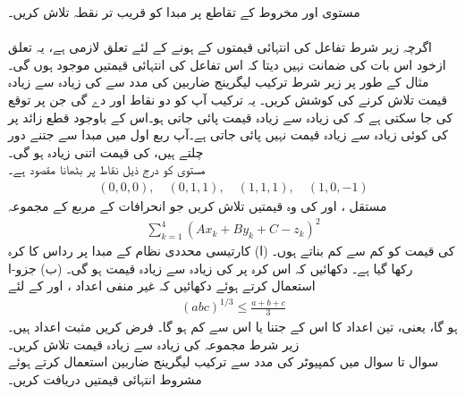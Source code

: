 مستوی   اور  مخروط  کے تقاطع پر مبدا کو قریب تر نقطہ تلاش کریں۔
\\
\\
اگرچہ زیر  شرط  تفاعل   کی انتہائی قیمتوں کے ہونے کے  لئے  تعلق  لازمی ہے،  یہ تعلق  ازخود  اس بات کی ضمانت نہیں دیتا کہ  اس تفاعل کی انتہائی قیمتیں موجود ہوں گی۔ مثال کے طور پر زیر شرط  ترکیب لیگرینج  ضاربین کی مدد سے  کی زیادہ سے زیادہ قیمت تلاش کرنے کی کوشش کریں۔ یہ ترکیب آپ کو دو نقاط  اور  دے  گی جن پر توقع کی جا سکتی ہے کہ  کی زیادہ سے زیادہ قیمت پائی جاتی ہو۔اس کے باوجود قطع زائد   پر  کی کوئی  زیادہ سے زیادہ قیمت نہیں پائی جاتی ہے۔آپ ربع اول میں مبدا سے جتنے دور چلتے ہیں،  کی قیمت اتنی زیادہ ہو گی۔
\\
مستوی  کو درج ذیل نقاط  پر بٹھانا مقصود ہے۔ 
\begin{align*}
(0,0,0),\quad (0,1,1),\quad (1,1,1),\quad (1,0,-1)
\end{align*}
مستقل ،  اور  کی وہ قیمتیں تلاش کریں جو  انحرافات  کے  مربع کے مجموعہ
\begin{align*}
\sum_{k=1}^4 (Ax_k+By_k+C-z_k)^2
\end{align*}
کی قیمت کو کم سے کم بناتے ہوں۔
(ا) کارتیسی محددی  نظام کے مبدا پر  رداس  کا کرہ رکھا گیا ہے۔ دکھائیں کہ اس کرہ پر  کی زیادہ سے زیادہ قیمت  ہو گی۔  (ب) جزو-ا استعمال کرتے ہوئے دکھائیں کہ غیر منفی اعداد ،  اور  کے لئے
\begin{align*}
(abc)^{1/3}\le \frac{a+b+c}{3}
\end{align*}
ہو گا، یعنی،  تین اعداد کا  اس کے    جتنا یا اس سے کم ہو گا۔
فرض کریں  مثبت  اعداد ہیں۔زیر شرط   مجموعہ   کی زیادہ سے زیادہ قیمت تلاش کریں۔
\\
سوال  تا سوال  میں کمپیوٹر کی مدد سے  ترکیب لیگرینج ضاربین استعمال کرتے ہوئے   مشروط انتہائی  قیمتیں دریافت کریں۔
